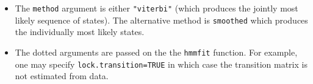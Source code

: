 \documentclass{article}
\def\code#1{\texttt{#1}}
\begin{document}
\begin{itemize}
\item The \verb'method' argument is either
\verb'"viterbi"' (which produces the jointly most likely
sequence of states). The alternative method is \verb'smoothed' which
produces the individually most likely states. 


\item The dotted arguments are
passed on the the \verb'hmmfit' function. For example, one may specify
\code{lock.transition=TRUE} in which case the transition matrix is not
estimated from data.

\end{itemize}
\end{document}
